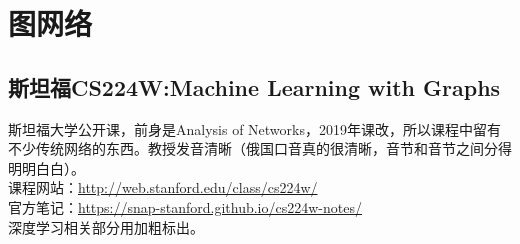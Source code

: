 \documentclass[lang=cn,11pt,a4paper]{elegant_template}
\begin{document}
\section{图网络}
\subsection{斯坦福CS224W:Machine Learning with Graphs}
斯坦福大学公开课，前身是Analysis of Networks，2019年课改，所以课程中留有不少传统网络的东西。教授发音清晰（俄国口音真的很清晰，音节和音节之间分得明明白白）。 \\
课程网站：\href{http://web.stanford.edu/class/cs224w/}{http://web.stanford.edu/class/cs224w/} \\
官方笔记：\href{https://snap-stanford.github.io/cs224w-notes/}{https://snap-stanford.github.io/cs224w-notes/} \\
深度学习相关部分用加粗标出。
\end{document}
